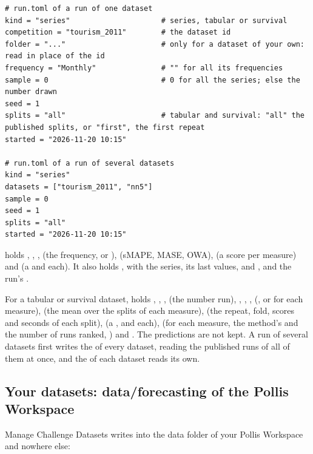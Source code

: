 \begin{lstlisting}
# run.toml of a run of one dataset
kind = "series"                     # series, tabular or survival
competition = "tourism_2011"        # the dataset id
folder = "..."                      # only for a dataset of your own: read in place of the id
frequency = "Monthly"               # "" for all its frequencies
sample = 0                          # 0 for all the series; else the number drawn
seed = 1
splits = "all"                      # tabular and survival: "all" the published splits, or "first", the first repeat
started = "2026-11-20 10:15"

# run.toml of a run of several datasets
kind = "series"
datasets = ["tourism_2011", "nn5"]
sample = 0
seed = 1
splits = "all"
started = "2026-11-20 10:15"
\end{lstlisting}

 holds , , ,  (the frequency, or
),  (sMAPE, MASE, OWA),  (a score per measure) and  (a
 and  each). It also holds , with the series, its last  values,
 and , and the run's .

For a tabular or survival dataset,  holds , , ,
 (the number run), , , ,  (,
 or  for each measure),  (the mean over the splits of each measure),
 (the repeat, fold, scores and seconds of each split),  (a ,  and
 each),  (for each measure, the method's  and the number of runs ranked, )
and . The predictions are not kept. A run of several datasets first writes the  of every
dataset, reading the published runs of all of them at once, and the  of each dataset reads its own.

\subsection{Your datasets: data/forecasting of the Pollis Workspace}
\label{sec:workspace}

Manage Challenge Datasets writes into the data folder of your Pollis Workspace and nowhere else:

